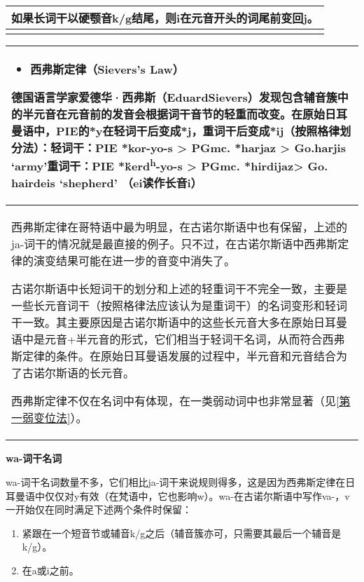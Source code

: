 \begin{longtable}{l}
  \toprule
  如果长词干以硬颚音k/g结尾，则i在元音开头的词尾前变回j。 \\
  \midrule
  \endhead
  \bottomrule
  \endfoot
\end{longtable}

\begin{longtable}{l}
  \toprule
  \begin{itemize}\item  西弗斯定律（Sievers\textbf{'}s Law）\end{itemize}德国语言学家爱德华·西弗斯（EduardSievers）发现包含辅音簇中的半元音在元音前的发音会根据词干音节的轻重而改变。在原始日耳曼语中，PIE的*y在\textbf{轻词干}后变成*j，\textbf{重词干}后变成*ij（按照格律划分法）：轻词干：PIE *kor-yo-s \textgreater{} PGmc. *harjaz \textgreater{} Go.harjis `army'重词干：PIE *ḱerd\textsuperscript{h}-yo-s \textgreater{} PGmc. *hirdijaz\textgreater{} Go. hairdeis `shepherd' （ei读作长音i） \\
  \midrule
  \endhead
  \bottomrule
  \endfoot
  西弗斯定律在哥特语中最为明显，在古诺尔斯语中也有保留，上述的ja-词干的情况就是最直接的例子。只不过，在古诺尔斯语中西弗斯定律的演变结果可能在进一步的音变中消失了。

  古诺尔斯语中长短词干的划分和上述的轻重词干不完全一致，主要是一些长元音词干（按照格律法应该认为是重词干）的名词变形和轻词干一致。其主要原因是古诺尔斯语中的这些长元音大多在原始日耳曼语中是元音+半元音的形式，它们相当于轻词干名词，从而符合西弗斯定律的条件。在原始日耳曼语发展的过程中，半元音和元音结合为了古诺尔斯语的长元音。

  西弗斯定律不仅在名词中有体现，在一类弱动词中也非常显著（见\ref{第一弱变位法}）。                                                                                                                                                                                                                                                                                                                                                                                                                    \\
\end{longtable}

\textbf{wa-词干名词}

wa-词干名词数量不多，它们相比ja-词干来说规则得多，这是因为西弗斯定律在日耳曼语中仅仅对y有效（在梵语中，它也影响w）。wa-在古诺尔斯语中写作va-，v一开始仅在同时满足下述两个条件时保留：

\begin{enumerate}
  \def\labelenumi{\arabic{enumi})}
  \item
        紧跟在一个短音节或辅音k/g之后（辅音簇亦可，只需要其最后一个辅音是k/g）。
  \item
        在a或i之前。
\end{enumerate}

